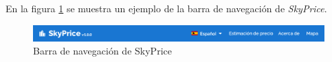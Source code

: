 En la figura \ref{fig:barra-navegacion} se muestra un ejemplo de la barra de navegación
de \textit{SkyPrice}.

\begin{figure}[H]
  \centering
  \includegraphics[width=1.0\textwidth]{imagenes/02-requerimientos/barra-navegacion.png}
  \caption{Barra de navegación de SkyPrice}
  \label{fig:barra-navegacion}
\end{figure}

